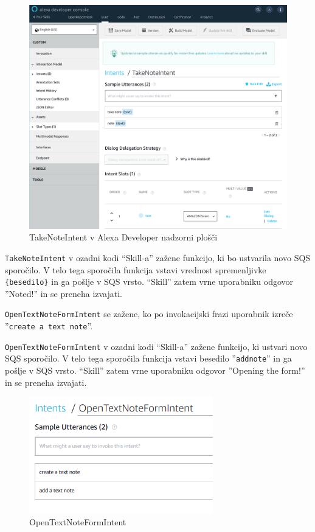 \documentclass[a4paper, 12pt]{book}
\begin{document}
\begin{figure}[H]
\begin{center}
\includegraphics[width=13cm]{intent_literal}
\end{center}
\caption{TakeNoteIntent v Alexa Developer nadzorni plošči}
\label{TakeNoteIntent}
\end{figure}

\texttt{TakeNoteIntent} v ozadni kodi \enquote{Skill-a} zažene funkcijo, ki bo ustvarila novo SQS sporočilo.
V telo tega sporočila funkcija vstavi vrednost spremenljivke \texttt{\{besedilo\}} in ga pošlje v SQS vrsto.
\enquote{Skill} zatem vrne uporabniku odgovor ''Noted!'' in se preneha izvajati.

\texttt{OpenTextNoteFormIntent} se zažene, ko po invokacijski frazi uporabnik izreče ''\texttt{create a text note}''.

\texttt{OpenTextNoteFormIntent} v ozadni kodi \enquote{Skill-a} zažene funkcijo, ki ustvari novo SQS sporočilo.
V telo tega sporočila funkcija vstavi besedilo ''\texttt{addnote}'' in ga pošlje v SQS vrsto.
\enquote{Skill} zatem vrne uporabniku odgovor ''Opening the form!'' in se preneha izvajati.


\begin{figure}[H]
\begin{center}
\includegraphics[width=8cm]{intent_text}
\end{center}
\caption{OpenTextNoteFormIntent}
\label{OpenTextNoteFormIntent}
\end{figure}
\end{document}
